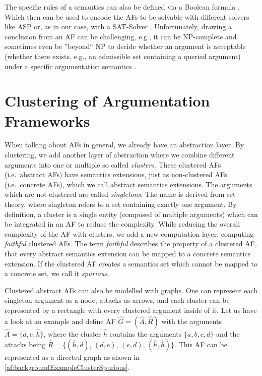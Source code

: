 The specific rules of a semantics can also be defined via a Boolean formula \cite{inproceedingsBesnardDoutreBooleanFormulaSemantics}. Which then can be used to encode the AFs to be solvable with different solvers like \ac{ASP} \cite{DBLP:journals/corr/abs-1301-1388} or, as in our case, with a \ac{SAT-Solver} \cite{DBLP:journals/amai/AmgoudD13}. Unfortunately, drawing a conclusion from an AF can be challenging, e.g., it can be NP-complete and sometimes even be ''beyond`` NP to decide whether an argument is acceptable (whether there exists, e.g., an admissible set containing a queried argument) under a specific argumentation semantics \cite{DBLP:journals/ai/DvorakGRW23}.



\section{Clustering of Argumentation Frameworks}
\label{sec:ClusteringOfArgumentationFrameworks}

When talking about AFs in general, we already have an abstraction layer. By clustering, we add another layer of abstraction where we combine different arguments into one or multiple so called \emph{clusters}. These clustered AFs (i.e.\ abstract AFs) have semantics extensions, just as non-clustered AFs (i.e.\ concrete AFs), which we call abstract semantics extensions. The arguments which are not clustered are called \emph{singletons}. The name is derived from set theory, where singleton refers to a set containing exactly one argument.
By definition, a cluster is a single entity (composed of multiple arguments) which can be integrated in an AF to reduce the complexity. While reducing the overall complexity of the AF with clusters, we add a new computation layer: computing \emph{faithful} clustered AFs. The term \emph{faithful} describes the property of a clustered AF, that every abstract semantics extension can be mapped to a concrete semantics extension. If the clustered AF creates a semantics set which cannot be mapped to a concrete set, we call it \emph{spurious}.

Clustered abstract AFs can also be modelled with graphs. One can represent each singleton argument as a node, attacks as arrows, and each cluster can be represented by a rectangle with every clustered argument inside of it. Let us have a look at an example and define AF $\hat{G}=(\hat{A}, \hat{R})$ with the arguments $\hat{A}=\{d, e, \hat{h}\}$, where the cluster $\hat{h}$ contains the arguments $\{a, b, c, d\}$ and the attacks being $\hat{R}=\bigl\{(\hat{h}, d)$, $(d, e)$, $(e, d)$, $(\hat{h},\hat{h})\bigl\}$.  This AF can be represented as a directed graph as shown in \cref{af:backgroundExampleClusterSpurious}.


